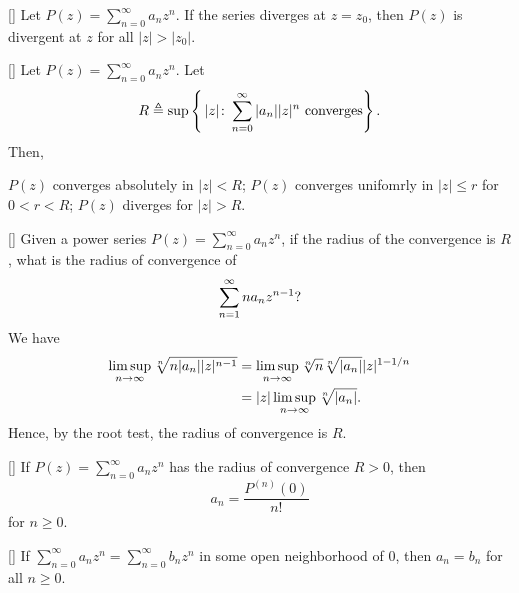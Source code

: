 \documentclass[../complex_variables_1.tex]{subfiles}
\begin{document}
\begin{Corollary}{}[]
    Let \(P(z) = \sum_{n=0}^\infty a_nz^n\).
    If the series diverges at \(z = z_0\), then \(P(z)\) is divergent at \(z\) for all \(|z| > |z_0|\).
\end{Corollary}

\begin{Corollary}{}[]
    Let \(P(z) = \sum_{n=0}^\infty a_nz^n\).
    Let
    \[
        R \triangleq \sup \left\{\,|z| \colon \sum_{n=0}^\infty |a_n| |z|^n\text{ converges} \right\}\text.
    \]
    Then,
    \begin{enumerate}[label=(\roman*)]
        \ii \(P(z)\) converges absolutely in \(|z| < R\);
        \ii \(P(z)\) converges unifomrly in \(|z| \le r\) for \(0 < r < R\);
        \ii \(P(z)\) diverges for \(|z| > R\).
    \end{enumerate}
\end{Corollary}

\begin{Example}{}[]
    Given a power series \(P(z) = \sum_{n=0}^\infty a_nz^n\),
    if the radius of the convergence is \(R\), what is the radius of convergence of
    \[
        \sum_{n=1}^\infty na_nz^{n-1}\text?
    \]
    We have
    \begin{align*}
        \limsup_{n\to\infty}\sqrt[n]{n|a_n||z|^{n-1}}
        &= \limsup_{n \to \infty} \sqrt[n]{n}\sqrt[n]{|a_n|}|z|^{1-1/n} \\
        &= |z| \limsup_{n \to \infty}\sqrt[n]{|a_n|}\text.
    \end{align*}
    Hence, by the root test, the radius of convergence is \(R\).
\end{Example}

\begin{Corollary}{}[]
    If \(P(z) = \sum_{n=0}^\infty a_nz^n\) has the radius of convergence \(R > 0\),
    then
    \[
        a_n = \frac{P^{(n)}(0)}{n!}
    \]
    for \(n \ge 0\).
\end{Corollary}

\begin{Corollary}{}[]
    If \(\sum_{n=0}^\infty a_nz^n = \sum_{n=0}^\infty b_nz^n\) in some open neighborhood of \(0\),
    then \(a_n = b_n\) for all \(n \ge 0\).
\end{Corollary}

\end{document}
